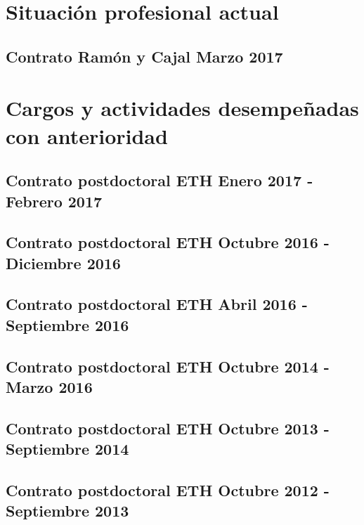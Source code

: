 \documentclass[a4paper, 11pt, twoside, openright]{report}
\begin{document}
\section{Situación profesional actual}

\subsection{Contrato Ramón y Cajal Marzo 2017}



\section{Cargos y actividades desempeñadas con anterioridad}

\subsection{Contrato postdoctoral ETH Enero 2017 - Febrero 2017}

\subsection{Contrato postdoctoral ETH Octubre 2016 - Diciembre 2016}

\subsection{Contrato postdoctoral ETH Abril 2016 - Septiembre 2016}

\subsection{Contrato postdoctoral ETH Octubre 2014 - Marzo 2016}

\subsection{Contrato postdoctoral ETH Octubre 2013 - Septiembre 2014}

\subsection{Contrato postdoctoral ETH Octubre 2012 - Septiembre 2013}

\end{document}
